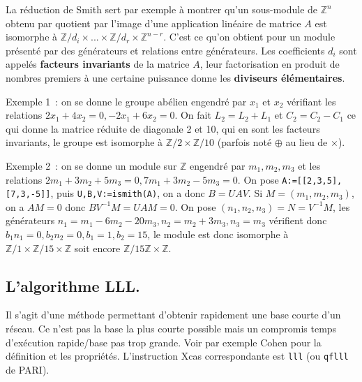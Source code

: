 \documentclass[a4paper,11pt]{book}
\begin{document}
\begin{giacjshere}
La r\'eduction de Smith sert par exemple \`a montrer
qu'un sous-module de $\mathbb{Z}^n$ obtenu par quotient par l'image 
d'une application lin\'eaire de matrice $A$ est isomorphe 
\`a $\mathbb{Z}/d_i \times ... \times \mathbb{Z}/d_r \times \mathbb{Z}^{n-r}$. C'est ce
qu'on obtient pour un module pr\'esent\'e par des g\'en\'erateurs
et relations entre g\'en\'erateurs.
Les coefficients $d_i$ sont appel\'es {\bf facteurs
invariants} de la
matrice $A$, leur factorisation en produit de nombres 
premiers \`a une certaine puissance donne les {\bf diviseurs 
\'el\'ementaires}.

Exemple 1~: on se donne le groupe ab\'elien engendr\'e par $x_1$ et
$x_2$ v\'erifiant les relations $2x_1+4x_2=0, -2x_1+6x_2=0$. On fait
$L_2=L_2+L_1$ et $C_2=C_2-C_1$ ce qui donne la matrice r\'eduite
de diagonale 2 et 10, qui en sont les facteurs invariants, le groupe
est isomorphe \`a $\mathbb{Z}/2 \times \mathbb{Z}/10$ (parfois not\'e 
$\oplus$ au lieu de $\times$).

Exemple 2~: on se donne un module sur $\mathbb{Z}$ engendr\'e par $m_1,m_2,m_3$
et les relations $2m_1+3m_2+5m_3=0, 7m_1+3m_2-5m_3=0$.
On pose \verb|A:=[[2,3,5],[7,3,-5]]|, puis
\verb|U,B,V:=ismith(A)|, on a donc $B=UAV$.
Si $M=(m_1,m_2,m_3)$, on a $AM=0$ donc $B V^{-1}M=UAM=0$.
On pose $(n_1,n_2,n_3)=N=V^{-1}M$, 
les g\'en\'erateurs $n_1=m_1-6m_2-20m_3, n_2=m_2+3m_3,n_3=m_3$
v\'erifient donc $b_1 n_1=0, b_2n_2=0, b_1=1, b_2=15$, le module est donc
isomorphe \`a  $\mathbb{Z}/1 \times \mathbb{Z}/15 \times \mathbb{Z}$ soit encore $\mathbb{Z}/15\mathbb{Z}
\times \mathbb{Z}$.

\subsection{L'algorithme LLL.} 
Il s'agit d'une m\'ethode permettant d'obtenir rapidement
une base courte d'un r\'eseau. Ce n'est pas la base la plus courte
possible mais un compromis temps d'ex\'ecution rapide/base
pas trop grande. Voir par exemple Cohen pour la d\'efinition
et les propri\'et\'es. L'instruction Xcas correspondante est
\verb|lll| (ou \verb|qflll| de PARI).


\end{giacjshere}
\end{document}
